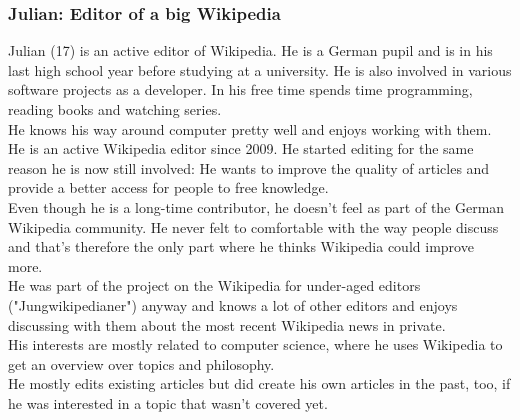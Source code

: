 \documentclass[11pt]{article}
\begin{document}
\subsubsection{Julian: Editor of a big Wikipedia}
Julian (17) is an active editor of Wikipedia. He is a German pupil and is in his last high school year before studying at a university. He is also involved in various software projects as a developer. In his free time spends time programming, reading books and watching series. \\
He knows his way around computer pretty well and enjoys working with them. \\
He is an active Wikipedia editor since 2009. He started editing for the same reason he is now still involved: He wants to improve the quality of articles and provide a better access for people to free knowledge. \\
Even though he is a long-time contributor, he doesn't feel as part of the German Wikipedia community. He never felt to comfortable with the way people discuss and that's therefore the only part where he thinks Wikipedia could improve more. \\
He was part of the project on the Wikipedia for under-aged editors ("Jungwikipedianer") anyway and knows a lot of other editors and enjoys discussing with them about the most recent Wikipedia news in private. \\
His interests are mostly related to computer science, where he uses Wikipedia to get an overview over topics and philosophy. \\
He mostly edits existing articles but did create his own articles in the past, too, if he was interested in a topic that wasn't covered yet.
\end{document}
